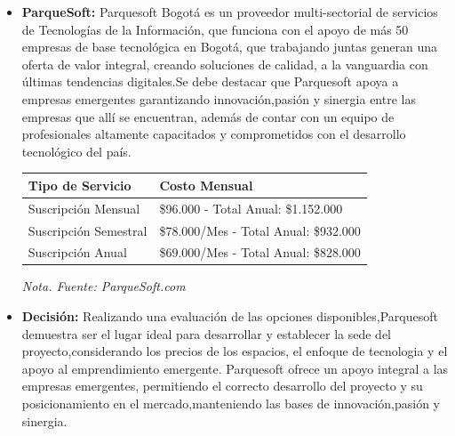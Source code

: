 \begin{itemize}
    \item \textbf{ParqueSoft:} Parquesoft Bogotá es un proveedor multi-sectorial de servicios de Tecnologías de la Información, que funciona con el apoyo de más 50 empresas de base tecnológica en Bogotá, que trabajando juntas generan una oferta de valor integral, creando soluciones de calidad, a la vanguardia con últimas tendencias digitales.Se debe destacar que Parquesoft apoya a empresas emergentes garantizando innovación,pasión y sinergia entre las empresas que allí se encuentran, además de contar con un equipo de profesionales altamente capacitados y comprometidos con el desarrollo tecnológico del país.

\begin{adjustbox}{center, caption={Precios de Espacios en ParqueSoft}, label={ParqueSoftPrecios}, nofloat=table, vspace={20px}}
    \begin{threeparttable}
        \centering
        \begin{tabular}{|p{7cm}|p{8cm}|}  %
            \hline
            \cellcolor[HTML]{D9EAD3}\textbf{Tipo de Servicio} & \cellcolor[HTML]{D9EAD3}\textbf{Costo Mensual} \\ \hline
            Suscripción Mensual   & \$96.000 - Total Anual: \$1.152.000 \\ \hline
            Suscripción Semestral & \$78.000/Mes - Total Anual: \$932.000 \\ \hline
            Suscripción Anual     & \$69.000/Mes - Total Anual: \$828.000 \\ \hline
        \end{tabular}
        \begin{tablenotes}
            \vspace{2mm}
            \textit{Nota. Fuente: ParqueSoft.com}
        \end{tablenotes}
    \end{threeparttable}
\end{adjustbox}

\item \textbf{Decisión:} Realizando una evaluación de las opciones disponibles,Parquesoft demuestra ser el lugar ideal para desarrollar y establecer la sede del proyecto,considerando los precios de los espacios, el enfoque de tecnologia y el apoyo al emprendimiento emergente. Parquesoft ofrece un apoyo integral a las empresas emergentes, permitiendo el correcto desarrollo del proyecto y su posicionamiento en el mercado,manteniendo las bases de innovación,pasión y sinergia.
\end{itemize}

